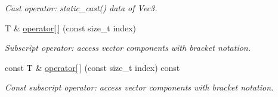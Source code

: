 \begin{DoxyCompactItemize}
\begin{DoxyCompactList}\small\item\em Cast operator\+: static\+\_\+cast() data of Vec3. \end{DoxyCompactList}\item 
T \& \hyperlink{structVec_3_01T_00_013_01_4_a5f0a78557890a6d86d0ac2282426217b}{operator\mbox{[}$\,$\mbox{]}} (const size\+\_\+t index)
\begin{DoxyCompactList}\small\item\em Subscript operator\+: access vector components with bracket notation. \end{DoxyCompactList}\item 
const T \& \hyperlink{structVec_3_01T_00_013_01_4_af2d3eabac7af9dfa72a89b3370a24ed2}{operator\mbox{[}$\,$\mbox{]}} (const size\+\_\+t index) const 
\begin{DoxyCompactList}\small\item\em Const subscript operator\+: access vector components with bracket notation. \end{DoxyCompactList}\end{DoxyCompactItemize}
